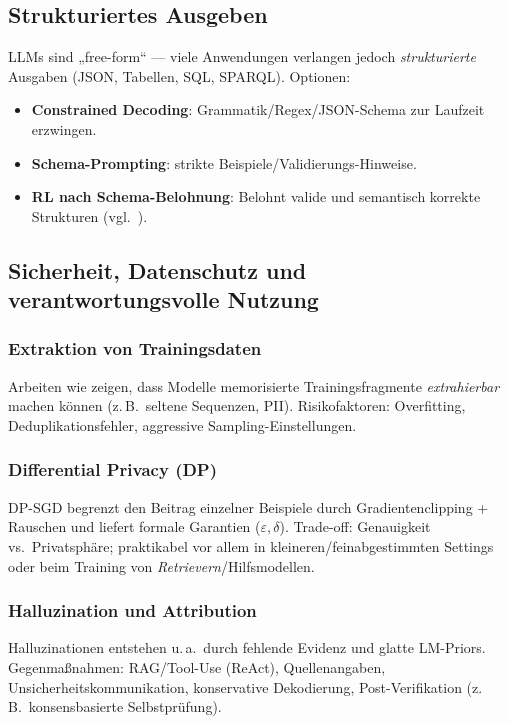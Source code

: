 \subsection{Strukturiertes Ausgeben}
LLMs sind „free-form“ — viele Anwendungen verlangen jedoch \emph{strukturierte} Ausgaben (JSON, Tabellen, SQL, SPARQL). Optionen:
\begin{itemize}
  \item \textbf{Constrained Decoding}: Grammatik/Regex/JSON-Schema zur Laufzeit erzwingen.
  \item \textbf{Schema-Prompting}: strikte Beispiele/Validierungs-Hinweise.
  \item \textbf{RL nach Schema-Belohnung}: Belohnt valide und semantisch korrekte Strukturen (vgl.\ \cite{cong2023schema}).
\end{itemize}

\subsection{Sicherheit, Datenschutz und verantwortungsvolle Nutzung}
\subsubsection{Extraktion von Trainingsdaten}
Arbeiten wie \cite{carlini2021extracting} zeigen, dass Modelle memorisierte Trainingsfragmente \emph{extrahierbar} machen können (z.\,B.\ seltene Sequenzen, PII). Risikofaktoren: Overfitting, Deduplikationsfehler, aggressive Sampling-Einstellungen.

\subsubsection{Differential Privacy (DP)}
DP-SGD \cite{abadi2016deep} begrenzt den Beitrag einzelner Beispiele durch Gradientenclipping + Rauschen und liefert formale Garantien ($\varepsilon,\delta$). Trade-off: Genauigkeit vs.\ Privatsphäre; praktikabel vor allem in kleineren/feinabgestimmten Settings oder beim Training von \emph{Retrievern}/Hilfsmodellen.

\subsubsection{Halluzination und Attribution}
Halluzinationen entstehen u.\,a.\ durch fehlende Evidenz und glatte LM-Priors. Gegenmaßnahmen: RAG/Tool-Use (ReAct), Quellenangaben, Unsicherheitskommunikation, konservative Dekodierung, Post-Verifikation (z.\,B.\ konsensbasierte Selbstprüfung).

